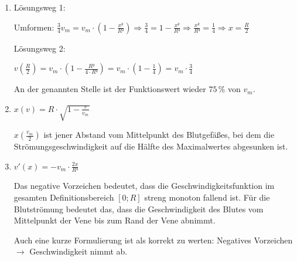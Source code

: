 \begin{langesbeispiel}
{\begin{enumerate}
	Außerdem setzt die Formel voraus, dass das Blutgefäß an jeder Stelle einen kreisförmigen Querschnitt mit einem konstanten Radius $R$ hat bzw. dass das Blutgefäß exakt zylinderförmig ist (Venen haben auch Venenklappen).
	
Schließlich strömt das Blut zeitlich nicht mit konstanter Geschwindigkeit,
 die Blutgeschwindigkeit verändert sich periodisch.

\item Lösungsweg 1:

Umformen: $\frac{3}{4}v_m=v_m\cdot\left(1-\frac{x²}{R²}\right)\Rightarrow\frac{3}{4}=1-\frac{x²}{R²}\Rightarrow\frac{x²}{R²}=\frac{1}{4}\Rightarrow x=\frac{R}{2}$

Lösungsweg 2:

$v\left(\frac{R}{2}\right)=v_m\cdot\left(1-\frac{R²}{4\cdot R²}\right)=v_m\cdot\left(1-\frac{1}{4}\right)=v_m\cdot \frac{3}{4}$

An der genannten Stelle ist der Funktionswert wieder $75\,\%$ von $v_m$.

\item $x(v)=R\cdot\sqrt{1-\frac{v}{v_m}}$

$x\left(\frac{v_m}{2}\right)$ ist jener Abstand vom Mittelpunkt des Blutgefäßes, bei dem die Strömungsgeschwindigkeit auf die Hälfte des Maximalwertes abgesunken ist.

\item $v'(x)=-v_m\cdot \frac{2x}{R²}$

Das negative Vorzeichen bedeutet, dass die Geschwindigkeitsfunktion
 im gesamten Definitionsbereich $[0;R]$ streng monoton fallend ist. Für die Blutströmung bedeutet das, dass die Geschwindigkeit des Blutes vom Mittelpunkt der Vene bis zum Rand der Vene abnimmt.

Auch eine kurze Formulierung ist als korrekt zu werten: Negatives Vorzeichen 
$\rightarrow$ Geschwindigkeit nimmt ab.
	\end{enumerate}}
		\end{langesbeispiel}